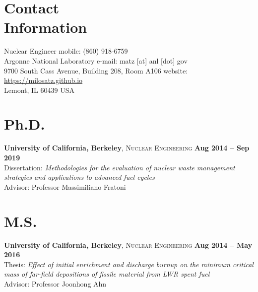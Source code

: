 \documentclass[margin,line]{resume}
\begin{document}
\begin{resume}
\section{\mysidestyle Contact\\Information}
    Nuclear Engineer
        \hfill mobile: (860) 918-6759 \\
    Argonne National Laboratory
        \hfill e-mail: matz [at] anl [dot] gov \\
    9700 South Cass Avenue, Building 208, Room A106
        \hfill website: \url{https://milosatz.github.io}\\
    Lemont, IL 60439 USA
%
%
%
%

\section{\mysidestyle Ph.D.}
    \textbf{University of California, Berkeley}, 
    \textsc{Nuclear Engineering} \hfill 
    \textbf{Aug 2014 -- Sep 2019} \vspace{1mm} \\
    Dissertation: \textsl{Methodologies for the evaluation of nuclear waste management strategies and applications to advanced fuel cycles} \\
    Advisor: Professor Massimiliano Fratoni

\section{\mysidestyle M.S.}
    \textbf{University of California, Berkeley}, 
    \textsc{Nuclear Engineering} \hfill 
    \textbf{Aug 2014 -- May 2016} \vspace{1mm} \\
    Thesis: \textsl{Effect of initial enrichment and discharge burnup on the minimum critical mass of far-field depositions of fissile material from LWR spent fuel} \\
    Advisor: Professor Joonhong Ahn


\end{resume}
\end{document}
